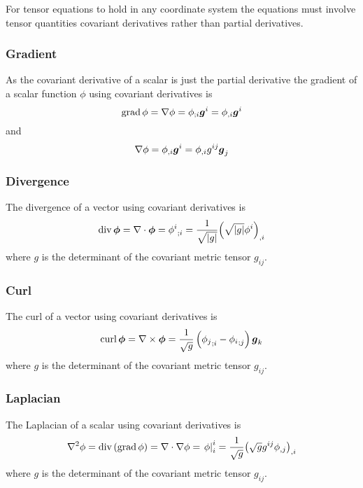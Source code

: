 For tensor equations to hold in any coordinate system the equations must
involve tensor quantities \ie covariant derivatives rather than partial derivatives.

\subsubsection{Gradient}

As the covariant derivative of a scalar is just the partial derivative the
gradient of a scalar function $\phi$ using covariant derivatives is
\begin{equation}
  \gradop \phi = \gradient{}{\phi}=\covarderiv{\phi}{i}\vectr{g}^{i}=\partialderiv{\phi}{i}\vectr{g}^{i}
\end{equation}
and
\begin{equation}
  \gradient{}{\phi}=\partialderiv{\phi}{i}\vectr{g}^{i}=\partialderiv{\phi}{i}g^{ij}\vectr{g}_{j}
\end{equation}

\subsubsection{Divergence}

The divergence of a vector using covariant derivatives is
\begin{equation}
  \divop \vectr{\phi} = \divergence{}{\vectr{\phi}}=\covarderiv{\phi^{i}}{i}=\frac{1}{\sqrt{\abs{g}}}\partialderiv{\pbrac{\sqrt{\abs{g}}\phi^{i}}}{i}
\end{equation}
where $g$ is the determinant of the covariant metric tensor $g_{ij}$.

\subsubsection{Curl}

The curl of a vector using covariant derivatives is
\begin{equation}
  \curlop \vectr{\phi} = \curl{}{\vectr{\phi}}=\frac{1}{\sqrt{g}}\pbrac{\covarderiv{\phi_{j}}{i}-\covarderiv{\phi_{i}}{j}}\vectr{g}_{k}
\end{equation}
where $g$ is the determinant of the covariant metric tensor $g_{ij}$.

\subsubsection{Laplacian}

The Laplacian of a scalar using covariant derivatives is
\begin{equation}
  \laplacian{}{\phi}=\divop\pbrac{\gradop\phi}=\divergence{}{\gradient{}{\phi}}=\mixedderiv{\phi}{i}{i}=\frac{1}{\sqrt{g}}\partialderiv{\pbrac{\sqrt{g}g^{ij}\partialderiv{\phi}{j}}}{i}
\end{equation}
where $g$ is the determinant of the covariant metric tensor $g_{ij}$.

